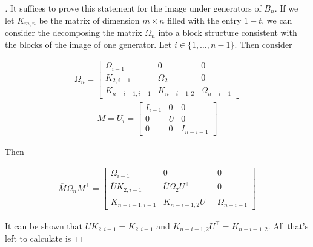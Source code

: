 \documentclass[10pt]{ucthesis}
\begin{document}
\noindent\begin{proof}[\cite{Kassel}] It suffices to prove this statement for the image under generators of $B_n$. If we let $K_{m,n}$ be the matrix of dimension $m\times n$ filled with the entry $1-t$, we can consider the decomposing the matrix $\Omega_n$ into a block structure consistent with the blocks of the image of one generator. Let $i\in\{1,\hdots,n-1\}$. Then consider 

\begin{equation}
	\begin{aligned}
		\Omega_n = \begin{bmatrix}
							\Omega_{i-1} & 0 & 0\\
							K_{2,i-1} & \Omega_2 & 0 \\
							K_{n-i-1,i-1}& K_{n-i-1,2}&\Omega_{n-i-1}
						\end{bmatrix}
	\end{aligned}
\end{equation}
\begin{equation}
	\begin{aligned}
		M = U_i = \begin{bmatrix}
							I_{i-1} & 0 & 0\\
							0 & U & 0 \\
							0& 0&I_{n-i-1}
						\end{bmatrix}
	\end{aligned}
\end{equation}

Then

\begin{equation}
	\begin{aligned}
		\overline{M}\Omega_nM^\intercal = \begin{bmatrix}
														\Omega_{i-1} & 0 & 0\\
														\overline{U}K_{2,i-1} & \overline{U}\Omega_2U^\intercal & 0 \\
														K_{n-i-1,i-1}& K_{n-i-1,2}U^\intercal&\Omega_{n-i-1}
													\end{bmatrix}
	\end{aligned}
\end{equation}

It can be shown that $\overline{U}K_{2,i-1} = K_{2,i-1}$ and $K_{n-i-1,2}U^\intercal=K_{n-i-1,2}$. All that's left to calculate is 



\end{proof}
\end{document}
